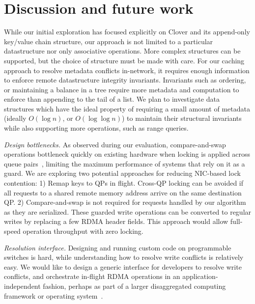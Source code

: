 \section{Discussion and future work}
\label{sec:future}

While our initial exploration has focused explicitly on Clover and its
append-only key/value chain structure, our approach is not limited to
a particular datastructure nor only associative operations. More
complex structures can be supported, but the choice of structure must
be made with care.  For our caching approach to resolve metadata
conflicts in-network, it requires enough information to enforce remote
datastructure integrity invariants. Invariants such as ordering, or
maintaining a balance in a tree require more metadata and computation
to enforce than appending to the tail of a list. We plan to
investigate data structures which have the ideal property of requiring
a small amount of metadata (ideally $O(\log n)$, or $O(\log\log n)$) to
maintain their structural invariants while also supporting more
operations, such as range queries.

\emph{Design bottlenecks.} As observed during our evaluation,
compare-and-swap operations bottleneck quickly on existing hardware
when locking is applied across queue pairs~\cite{design-guidelines},
limiting the maximum performance of systems that rely on it as a
guard.  We are exploring two potential approaches for reducing
NIC-based lock contention: 1) Remap keys to QPs in flight. Cross-QP
locking can be avoided if all requests to a shared remote memory
address arrive on the same destination QP. 2) Compare-and-swap is not
required for requests handled by our algorithm as they are serialized.
These guarded write operations can be converted to regular writes by
replacing a few RDMA header fields. This approach would allow
full-speed operation throughput with zero locking.


\emph{Resolution interface.}
Designing and running custom code on programmable switches is hard,
while understanding how to resolve write conflicts is relatively
easy. We would like to design a generic interface for developers to
resolve write conflicts, and orchestrate in-flight RDMA operations in
an application-independent fashion, perhaps as part of a larger
disaggregated computing framework or operating system~\cite{legoos}.


